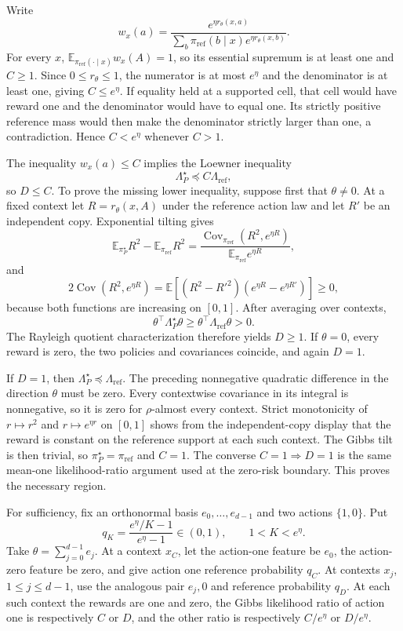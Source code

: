 Write
\[
w_x(a)=\frac{e^{\eta r_\theta(x,a)}}{\sum_b\pi_{\mathrm{ref}}(b\mid x)e^{\eta r_\theta(x,b)}}.
\]
For every \(x\), \(\mathbb E_{\pi_{\mathrm{ref}}(\cdot\mid x)}w_x(A)=1\), so its essential supremum is at least one and \(C\ge1\). Since \(0\le r_\theta\le1\), the numerator is at most \(e^\eta\) and the denominator is at least one, giving \(C\le e^\eta\). If equality held at a supported cell, that cell would have reward one and the denominator would have to equal one. Its strictly positive reference mass would then make the denominator strictly larger than one, a contradiction. Hence \(C<e^\eta\) whenever \(C>1\).

The inequality \(w_x(a)\le C\) implies the Loewner inequality
\[
\Lambda_P^\star\preceq C\Lambda_{\mathrm{ref}},
\]
so \(D\le C\). To prove the missing lower inequality, suppose first that \(\theta\ne0\). At a fixed context let \(R=r_\theta(x,A)\) under the reference action law and let \(R'\) be an independent copy. Exponential tilting gives
\[
\mathbb E_{\pi_P^\star}R^2-\mathbb E_{\pi_{\mathrm{ref}}}R^2
=\frac{\operatorname{Cov}_{\pi_{\mathrm{ref}}}(R^2,e^{\eta R})}{\mathbb E_{\pi_{\mathrm{ref}}}e^{\eta R}},
\]
and
\[
2\operatorname{Cov}(R^2,e^{\eta R})
=\mathbb E[(R^2-R'^2)(e^{\eta R}-e^{\eta R'})]\ge0,
\]
because both functions are increasing on \([0,1]\). After averaging over contexts,
\[
\theta^\top\Lambda_P^\star\theta\ge\theta^\top\Lambda_{\mathrm{ref}}\theta>0.
\]
The Rayleigh quotient characterization therefore yields \(D\ge1\). If \(\theta=0\), every reward is zero, the two policies and covariances coincide, and again \(D=1\).

If \(D=1\), then \(\Lambda_P^\star\preceq\Lambda_{\mathrm{ref}}\). The preceding nonnegative quadratic difference in the direction \(\theta\) must be zero. Every contextwise covariance in its integral is nonnegative, so it is zero for \(\rho\)-almost every context. Strict monotonicity of \(r\mapsto r^2\) and \(r\mapsto e^{\eta r}\) on \([0,1]\) shows from the independent-copy display that the reward is constant on the reference support at each such context. The Gibbs tilt is then trivial, so \(\pi_P^\star=\pi_{\mathrm{ref}}\) and \(C=1\). The converse \(C=1\Rightarrow D=1\) is the same mean-one likelihood-ratio argument used at the zero-risk boundary. This proves the necessary region.

For sufficiency, fix an orthonormal basis \(e_0,\ldots,e_{d-1}\) and two actions \(\{1,0\}\). Put
\[
q_K=\frac{e^\eta/K-1}{e^\eta-1}\in(0,1),\qquad 1<K<e^\eta.
\]
Take \(\theta=\sum_{j=0}^{d-1}e_j\). At a context \(x_C\), let the action-one feature be \(e_0\), the action-zero feature be zero, and give action one reference probability \(q_C\). At contexts \(x_j\), \(1\le j\le d-1\), use the analogous pair \(e_j,0\) and reference probability \(q_D\). At each such context the rewards are one and zero, the Gibbs likelihood ratio of action one is respectively \(C\) or \(D\), and the other ratio is respectively \(C/e^\eta\) or \(D/e^\eta\).

